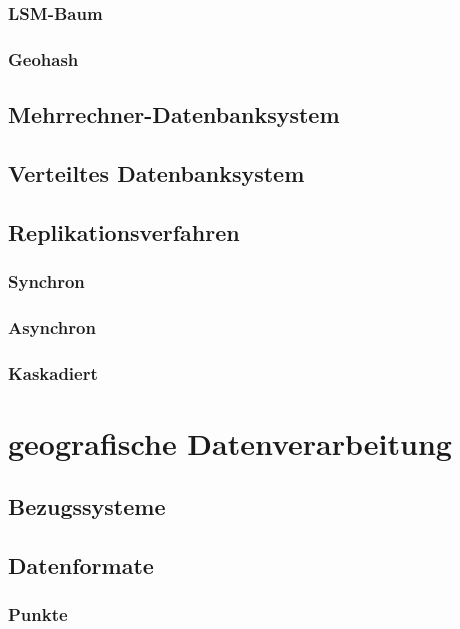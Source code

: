 \subsubsection{LSM-Baum}

\subsubsection{Geohash}

\subsection{Mehrrechner-Datenbanksystem}

\subsection{Verteiltes Datenbanksystem}

\subsection{Replikationsverfahren}

\subsubsection{Synchron}

\subsubsection{Asynchron}

\subsubsection{Kaskadiert}

\newpage

\section{geografische Datenverarbeitung}

\subsection{Bezugssysteme}

\subsection{Datenformate}

\subsubsection{Punkte}

